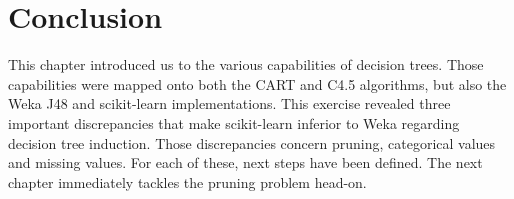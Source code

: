 \section{Conclusion}
This chapter introduced us to the various capabilities of decision trees. Those capabilities were mapped onto both the CART and C4.5 algorithms, but also the Weka J48 and scikit-learn implementations. This exercise revealed three important discrepancies that make scikit-learn inferior to Weka regarding decision tree induction. Those discrepancies concern pruning, categorical values and missing values. For each of these, next steps have been defined. The next chapter immediately tackles the pruning problem head-on.
